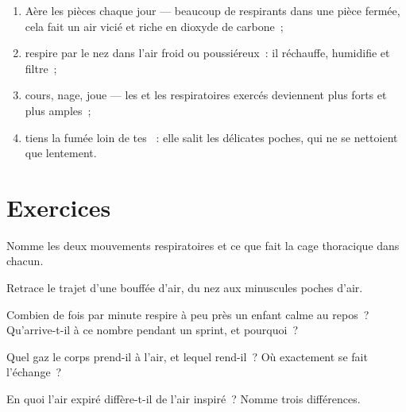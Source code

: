 \begin{method}\label{met:g4:breathing:care}
\begin{enumerate}
  \item Aère les pièces chaque jour --- beaucoup de respirants dans
        une pièce fermée, cela fait un air vicié et riche en
        dioxyde de carbone~;
  \item respire par le nez dans l'air froid ou poussiéreux~: il
        réchauffe, humidifie et filtre~;
  \item cours, nage, joue --- les  et les 
        respiratoires exercés deviennent plus forts et plus
        amples~;
  \item tiens la fumée loin de tes ~: elle salit les
        délicates poches, qui ne se nettoient que lentement.
\end{enumerate}
\end{method}

\section{Exercices}

\begin{exercise}[$\star$]\label{exo:g4:breathing:1}
Nomme les deux mouvements respiratoires et ce que fait la cage
thoracique dans chacun.
\end{exercise}

\begin{exercise}[$\star$]\label{exo:g4:breathing:2}
Retrace le trajet d'une bouffée d'air, du nez aux minuscules poches
d'air.
\end{exercise}

\begin{exercise}[$\star$]\label{exo:g4:breathing:3}
Combien de fois par minute respire à peu près un enfant calme au
repos~? Qu'arrive-t-il à ce nombre pendant un sprint, et pourquoi~?
\end{exercise}

\begin{exercise}[$\star$]\label{exo:g4:breathing:4}
Quel gaz le corps prend-il à l'air, et lequel rend-il~? Où
exactement se fait l'échange~?
\end{exercise}

\begin{exercise}[$\star$]\label{exo:g4:breathing:5}
En quoi l'air expiré diffère-t-il de l'air inspiré~? Nomme trois
différences.
\end{exercise}

